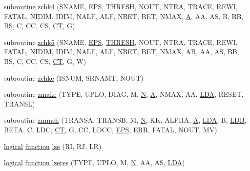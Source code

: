 \begin{DoxyCompactItemize}
\item 
subroutine \hyperlink{zblat3_8f_ad005a5b6ec687baad95da19c9165d3d7}{zchk4} (S\+N\+A\+M\+E, \hyperlink{tukey_8c_a6ebf6899d6c1c8b7b9d09be872c05aae}{E\+P\+S}, \hyperlink{zlaqgs_8c_a0656018abfc9fa2821827415f5d5ea57}{T\+H\+R\+E\+S\+H}, N\+O\+U\+T, N\+T\+R\+A, T\+R\+A\+C\+E, R\+E\+W\+I, F\+A\+T\+A\+L, N\+I\+D\+I\+M, I\+D\+I\+M, N\+A\+L\+F, A\+L\+F, N\+B\+E\+T, B\+E\+T, N\+M\+A\+X, \hyperlink{classA}{A}, A\+A, A\+S, B, B\+B, B\+S, C, C\+C, C\+S, \hyperlink{tau_8h_ae9ab3801c1afb4f20cfd669d76aec283}{C\+T}, G)
\item 
subroutine \hyperlink{zblat3_8f_a76eeceec4d1180776d76b64678154386}{zchk5} (S\+N\+A\+M\+E, \hyperlink{tukey_8c_a6ebf6899d6c1c8b7b9d09be872c05aae}{E\+P\+S}, \hyperlink{zlaqgs_8c_a0656018abfc9fa2821827415f5d5ea57}{T\+H\+R\+E\+S\+H}, N\+O\+U\+T, N\+T\+R\+A, T\+R\+A\+C\+E, R\+E\+W\+I, F\+A\+T\+A\+L, N\+I\+D\+I\+M, I\+D\+I\+M, N\+A\+L\+F, A\+L\+F, N\+B\+E\+T, B\+E\+T, N\+M\+A\+X, A\+B, A\+A, A\+S, B\+B, B\+S, C, C\+C, C\+S, \hyperlink{tau_8h_ae9ab3801c1afb4f20cfd669d76aec283}{C\+T}, G, W)
\item 
subroutine \hyperlink{zblat3_8f_aeded6062b08910a66e33a41338f27a62}{zchke} (I\+S\+N\+U\+M, S\+R\+N\+A\+M\+T, N\+O\+U\+T)
\item 
subroutine \hyperlink{zblat3_8f_ab7f039588ca168e574676bc6b4139ef7}{zmake} (T\+Y\+P\+E, U\+P\+L\+O, D\+I\+A\+G, M, \hyperlink{polmisc_8c_a0240ac851181b84ac374872dc5434ee4}{N}, \hyperlink{classA}{A}, N\+M\+A\+X, A\+A, \hyperlink{example__user_8c_ae946da542ce0db94dced19b2ecefd1aa}{L\+D\+A}, R\+E\+S\+E\+T, T\+R\+A\+N\+S\+L)
\item 
subroutine \hyperlink{zblat3_8f_aa3b6f173885a4f541795864085fadd4d}{zmmch} (T\+R\+A\+N\+S\+A, T\+R\+A\+N\+S\+B, M, \hyperlink{polmisc_8c_a0240ac851181b84ac374872dc5434ee4}{N}, K\+K, A\+L\+P\+H\+A, \hyperlink{classA}{A}, \hyperlink{example__user_8c_ae946da542ce0db94dced19b2ecefd1aa}{L\+D\+A}, B, \hyperlink{example__user_8c_a50e90a7104df172b5a89a06c47fcca04}{L\+D\+B}, B\+E\+T\+A, C, L\+D\+C, \hyperlink{tau_8h_ae9ab3801c1afb4f20cfd669d76aec283}{C\+T}, G, C\+C, L\+D\+C\+C, \hyperlink{tukey_8c_a6ebf6899d6c1c8b7b9d09be872c05aae}{E\+P\+S}, E\+R\+R, F\+A\+T\+A\+L, N\+O\+U\+T, M\+V)
\item 
\hyperlink{tnc_8c_aa7b64cdf39500931f7b333343791a104}{logical} \hyperlink{afunc_8m_a7b5e596df91eadea6c537c0825e894a7}{function} \hyperlink{zblat3_8f_ae4cad52f33bff5c0957dfecbba90d45f}{lze} (R\+I, R\+J, L\+R)
\item 
\hyperlink{tnc_8c_aa7b64cdf39500931f7b333343791a104}{logical} \hyperlink{afunc_8m_a7b5e596df91eadea6c537c0825e894a7}{function} \hyperlink{zblat3_8f_a6a5b057b5599a1f088b2186199831883}{lzeres} (T\+Y\+P\+E, U\+P\+L\+O, M, \hyperlink{polmisc_8c_a0240ac851181b84ac374872dc5434ee4}{N}, A\+A, A\+S, \hyperlink{example__user_8c_ae946da542ce0db94dced19b2ecefd1aa}{L\+D\+A})

\end{DoxyCompactItemize}
